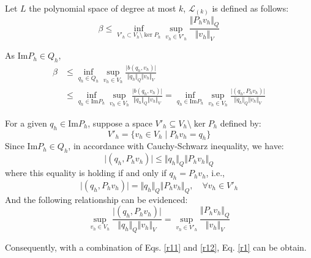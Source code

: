 \begin{thm}
    Let $L$ the polynomial space of degree at most $k$, $\mathcal L_{(k)}$ is defined as follows:
\begin{equation}\label{r1}
    \beta \le \inf_{V'_h \subset V_h \setminus \ker P_h} \sup_{v_h \in V'_h} \frac{\Vert P_h v_h \Vert_Q}{\Vert v_h \Vert_V}
\end{equation}
\end{thm}
\begin{pf}
    As $\mathrm{Im}P_h \in Q_h$,
\begin{equation} \label{r11}
\begin{split}
    \beta &\le \inf_{q_h \in Q_h} \sup_{v_h \in V_h} \frac{\vert b(q_h,v_h) \vert}{\Vert q_h \Vert_Q \Vert v_h \Vert_V} \\
    & \le \inf_{q_h \in \mathrm{Im}P_h} \sup_{v_h \in V_h} \frac{\vert b(q_h,v_h) \vert}{\Vert q_h \Vert_Q \Vert v_h \Vert_V} 
    = \inf_{q_h \in \mathrm{Im}P_h} \sup_{v_h \in V_h} \frac{\vert (q_h,P_h v_h) \vert}{\Vert q_h \Vert_Q \Vert v_h \Vert_V} 
\end{split}
\end{equation}

    For a given $q_h\in \mathrm{Im}P_h$, suppose a space $V'_h \subseteq V_h\setminus \ker P_h$ defined by:
\begin{equation}
    V'_h = \{ v_h \in V_h \; \vert \; P_h v_h = q_h \}
\end{equation}
    Since $\mathrm{Im}P_h \in Q_h$, in accordance with Cauchy-Schwarz inequality, we have:
\begin{equation}
    \vert (q_h,P_h v_h) \vert \le \Vert q_h \Vert_Q \Vert P_h v_h \Vert_Q
\end{equation}
where this equality is holding if and only if $q_h=P_h v_h$, i.e.,
\begin{equation}
    \vert (q_h,P_h v_h) \vert = \Vert q_h \Vert_Q \Vert P_h v_h \Vert_Q, \quad \forall v_h \in V'_h
\end{equation}
And the following relationship can be evidenced:
    \begin{equation}\label{r12}
    \sup_{v_h\in V_h} \frac{\vert (q_h,P_h v_h) \vert}{\Vert q_h \Vert_Q \Vert v_h \Vert_V} =
    \sup_{v_h\in V'_h} \frac{\Vert P_h v_h \Vert_Q}{\Vert v_h \Vert_V} 
\end{equation}

    Consequently, with a combination of Eqs. \eqref{r11} and \eqref{r12}, Eq. \eqref{r1} can be obtain.
\end{pf}

